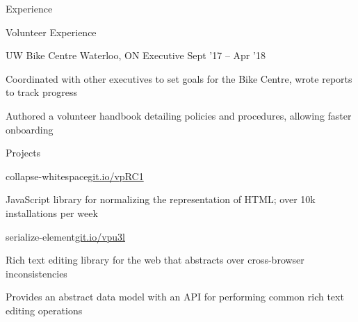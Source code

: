\documentclass{resume} %
\begin{document}
\begin{rSection}{Experience}
\end{rSection}


\begin{rSection}{Volunteer Experience}
  \begin{rSubsection}{UW Bike Centre}
                     {Waterloo, ON}
                     {Executive}
                     {Sept '17 -- Apr '18}
    \item Coordinated with other executives to set goals for the Bike Centre, wrote reports to track progress
    \item Authored a volunteer handbook detailing policies and procedures, allowing faster onboarding
  \end{rSubsection}
\end{rSection}


\begin{rSection}{Projects}
  \begin{rSubsection}{collapse-whitespace}{\href{https://git.io/vpRC1}{git.io/vpRC1}}{}{}
    \item JavaScript library for normalizing the representation of HTML; over 10k installations per week
  \end{rSubsection}

  \begin{rSubsection}{serialize-element}{\href{https://git.io/vpu3l}{git.io/vpu3l}}{}{}
    \item Rich text editing library for the web that abstracts over cross-browser inconsistencies
    \item Provides an abstract data model with an API for performing common rich text editing operations
  \end{rSubsection}

\end{rSection}
\end{document}
